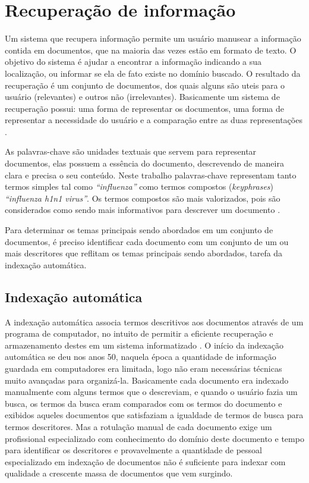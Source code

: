 \chapter{Recuperação de informação}
Um sistema que recupera informação permite um usuário manusear a informação contida em documentos, que na maioria das vezes estão em formato de texto. O objetivo do sistema é ajudar a encontrar a informação indicando a sua localização, ou informar se ela de fato existe no domínio buscado. O resultado da recuperação é um conjunto de documentos, dos quais alguns são uteis para o usuário (relevantes) e outros não (irrelevantes). Basicamente um sistema de recuperação possui: uma forma de representar os documentos, uma forma de representar a necessidade do usuário e a comparação entre as duas representações \cite{Goker2009}. 

As palavras-chave são unidades textuais que servem para representar documentos, elas possuem a essência do documento, descrevendo de maneira clara e precisa o seu conteúdo. Neste trabalho palavras-chave representam tanto termos simples tal como \emph{“influenza”} como termos compostos (\emph{keyphrases}) \emph{“influenza h1n1 virus”}. Os termos compostos são mais valorizados, pois são considerados como sendo mais informativos para descrever um documento \cite{Fagan1989}.

Para determinar os temas principais sendo abordados em um conjunto de documentos, é preciso identificar cada documento com um conjunto de um ou mais descritores que reflitam os temas principais sendo abordados, tarefa da indexação automática.

\section{Indexação automática}
A indexação automática associa termos descritivos aos documentos através de um programa de computador, no intuito de permitir a eficiente recuperação e armazenamento destes em um sistema informatizado \cite{Gonzalez2006}. O início da indexação automática se deu nos anos 50, naquela época a quantidade de informação guardada em computadores era limitada, logo não eram necessárias técnicas muito avançadas para organizá-la. Basicamente cada documento era indexado manualmente com alguns termos que o descreviam, e quando o usuário fazia um busca, os termos da busca eram comparados com os termos do documento e exibidos aqueles documentos que satisfaziam a igualdade de termos de busca para termos descritores. Mas a rotulação manual de cada documento exige um profissional especializado com conhecimento do domínio deste documento e tempo para identificar os descritores e provavelmente a quantidade de pessoal especializado em indexação de documentos não é suficiente para indexar com qualidade a crescente massa de documentos que vem surgindo.

